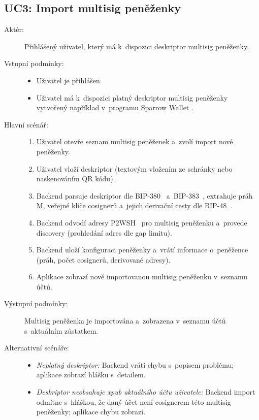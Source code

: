 \subsection{UC3: Import multisig peněženky}
\label{uc:import-multisig}

\begin{description}
  \item[Aktér:] Přihlášený uživatel, který má k~dispozici deskriptor multisig
    peněženky.
  \item[Vstupní podmínky:] \hfill
    \begin{itemize}
      \item Uživatel je přihlášen.
      \item Uživatel má k~dispozici platný deskriptor
            multisig peněženky vytvořený například v~programu
            Sparrow Wallet \cite{SparrowWallet}.
    \end{itemize}
  \item[Hlavní scénář:] \hfill
    \begin{enumerate}
      \item Uživatel otevře seznam multisig peněženek a~zvolí import nové peněženky.
      \item Uživatel vloží deskriptor (textovým vložením ze schránky nebo
            naskenováním QR kódu).
      \item Backend parsuje deskriptor dle BIP-380~\cite{BIP380} a~BIP-383~\cite{BIP383},
            extrahuje práh M, veřejné klíče cosignerů a~jejich derivační cesty
            dle BIP-48~\cite{BIP48}.
      \item Backend odvodí adresy P2WSH~\cite{BIP141} pro multisig peněženku
            a~provede discovery (prohledání adres dle gap limitu).
      \item Backend uloží konfiguraci peněženky a~vrátí informace o~peněžence
            (práh, počet cosignerů, derivované adresy).
      \item Aplikace zobrazí nově importovanou multisig peněženku v~seznamu účtů.
    \end{enumerate}
  \item[Výstupní podmínky:] Multisig peněženka je importována a~zobrazena v~seznamu
    účtů s~aktuálním zůstatkem.
  \item[Alternativní scénáře:] \hfill
    \begin{itemize}
      \item \emph{Neplatný deskriptor:} Backend vrátí chybu s~popisem problému;
            aplikace zobrazí hlášku s~detailem.
      \item \emph{Deskriptor neobsahuje xpub aktuálního účtu uživatele:}
            Backend import odmítne s~hláškou, že daný účet není cosignerem
            této multisig peněženky; aplikace chybu zobrazí.
    \end{itemize}
\end{description}

